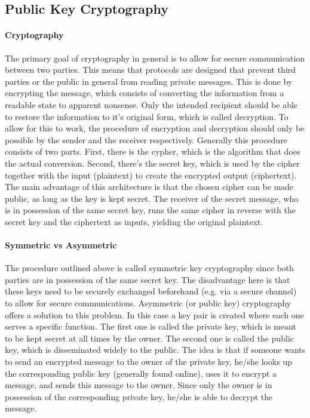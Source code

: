 \documentclass[master=cws,masteroption=vs,english]{kulemt}
\begin{document}
\subsection{Public Key Cryptography}
\label{sec:PKC}

\paragraph{Cryptography} The primary goal of cryptography in general is to allow for secure communication between two parties. This means that protocols are designed that prevent third parties or the public in general from reading private messages. This is done by encrypting the message, which consists of converting the information from a readable state to apparent nonsense. Only the intended recipient should be able to restore the information to it's original form, which is called decryption. To allow for this to work, the procedure of encryption and decryption should only be possible by the sender and the receiver respectively. Generally this procedure consists of two parts. First, there is the cypher, which is the algorithm that does the actual conversion. Second, there's the secret key, which is used by the cipher together with the input (plaintext) to create the encrypted output (ciphertext). The main advantage of this architecture is that the chosen cipher can be made public, as long as the key is kept secret. The receiver of the secret message, who is in possession of the same secret key, runs the same cipher in reverse with the secret key and the ciphertext as inputs, yielding the original plaintext.\cite{wiki:Cryptography}

\paragraph{Symmetric vs Asymmetric}The procedure outlined above is called symmetric key cryptography since both parties are in possession of the same secret key. The disadvantage here is that these keys need to be securely exchanged beforehand (e.g. via a secure channel) to allow for secure communications. Asymmetric (or public key) cryptography offers a solution to this problem. In this case a key pair is created where each one serves a specific function. The first one is called the private key, which is meant to be kept secret at all times by the owner. The second one is called the public key, which is disseminated widely to the public. The idea is that if someone wants to send an encrypted message to the owner of the private key, he/she looks up the corresponding public key (generally found online), uses it to encrypt a message, and sends this message to the owner. Since only the owner is in possession of the corresponding private key, he/she is able to decrypt the message.
\end{document}
